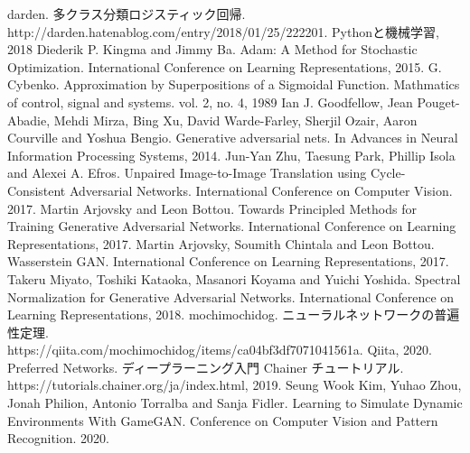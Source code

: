 \begin{thebibliography}{20}
     darden. 多クラス分類ロジスティック回帰. \\
    http://darden.hatenablog.com/entry/2018/01/25/222201. Pythonと機械学習, 2018
     Diederik P. Kingma and Jimmy Ba. Adam: A Method for Stochastic Optimization. 
    International Conference on Learning Representations, 2015.
     G. Cybenko. Approximation by Superpositions of a Sigmoidal Function. Mathmatics of control, signal and systems. vol. 2, no. 4, 1989
     Ian J. Goodfellow, Jean Pouget-Abadie, Mehdi Mirza, Bing Xu, David Warde-Farley, Sherjil Ozair, Aaron Courville and Yoshua Bengio. 
    Generative adversarial nets. In Advances in Neural Information Processing Systems, 2014.
     Jun-Yan Zhu, Taesung Park, Phillip Isola and Alexei A. Efros. Unpaired Image-to-Image Translation using Cycle-Consistent Adversarial Networks.
                    International Conference on Computer Vision. 2017.
    Martin Arjovsky and Leon Bottou. Towards Principled Methods for Training Generative Adversarial Networks.
    International Conference on Learning Representations, 2017.
     Martin Arjovsky, Soumith Chintala and Leon Bottou. Wasserstein GAN.
    International Conference on Learning Representations, 2017.
    Takeru Miyato, Toshiki Kataoka, Masanori Koyama and Yuichi Yoshida. Spectral Normalization for Generative Adversarial Networks. 
    International Conference on Learning Representations, 2018.
     mochimochidog. ニューラルネットワークの普遍性定理. \\
    https://qiita.com/mochimochidog/items/ca04bf3df7071041561a. Qiita, 2020.
    \bibitem{} Preferred Networks. ディープラーニング入門 Chainer チュートリアル.\\
    https://tutorials.chainer.org/ja/index.html, 2019.
     Seung Wook Kim, Yuhao Zhou, Jonah Philion, Antonio Torralba and Sanja Fidler.
    Learning to Simulate Dynamic Environments With GameGAN.  Conference on Computer Vision and Pattern Recognition. 2020.
\end{thebibliography}



